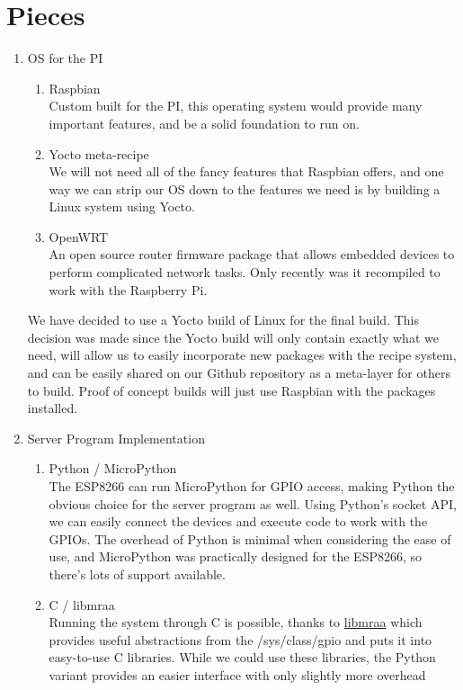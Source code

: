 \documentclass[12pt]{article}
\begin{document}
\section{Pieces}

\begin{enumerate}
    \item OS for the PI
        \begin{enumerate}
            \item Raspbian \\
                Custom built for the PI, this operating system would provide many important features, and be a solid foundation to run on.
            \item Yocto meta-recipe \\
                We will not need all of the fancy features that Raspbian offers, and one way we can strip our OS down to the features we need is by building a Linux system using Yocto.
            \item OpenWRT \\
                An open source router firmware package that allows embedded devices to perform complicated network tasks. Only recently was it recompiled to work with the Raspberry Pi. 
        \end{enumerate}
        We have decided to use a Yocto build of Linux for the final build. This decision was made since the Yocto build will only contain exactly what we need, will allow us to easily incorporate new packages with the recipe system, and can be easily shared on our Github repository as a meta-layer for others to build. Proof of concept builds will just use Raspbian with the packages installed.
    \item Server Program Implementation
        \begin{enumerate}
            \item Python / MicroPython \\
            The ESP8266 can run MicroPython for GPIO access, making Python the obvious choice for the server program as well. Using Python's socket API, we can easily connect the devices and execute code to work with the GPIOs. The overhead of Python is minimal when considering the ease of use, and MicroPython was practically designed for the ESP8266, so there's lots of support available.
            \item C / libmraa \\
            Running the system through C is possible, thanks to \href{https://github.com/intel-iot-devkit/mraa}{libmraa} which provides useful abstractions from the /sys/class/gpio and puts it into easy-to-use C libraries. While we could use these libraries, the Python variant provides an easier interface with only slightly more overhead

\end{enumerate}
\end{enumerate}
\end{document}
